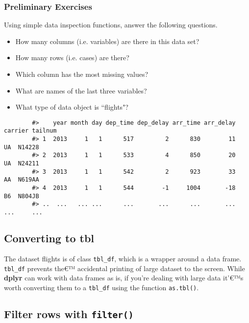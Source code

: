 	\subsubsection*{Preliminary Exercises}
	Using simple data inspection functions, answer the following questions. %
	\begin{itemize}
		\item How many columns (i.e. variables) are there in this data set?
		\item How many rows (i.e. cases) are there?
		\item Which column has the most missing values?
		\item What are names of the last three variables?
		\item What type of data object is ``flights"?
	\end{itemize}
	
	\begin{framed}
		\begin{verbatim}
		#>    year month day dep_time dep_delay arr_time arr_delay carrier tailnum
		#> 1  2013     1   1      517         2      830        11      UA  N14228
		#> 2  2013     1   1      533         4      850        20      UA  N24211
		#> 3  2013     1   1      542         2      923        33      AA  N619AA
		#> 4  2013     1   1      544        -1     1004       -18      B6  N804JB
		#> ..  ...   ... ...      ...       ...      ...       ...     ...     ...
		\end{verbatim}
	\end{framed}
	\subsection{Converting to tbl}
	The dataset flights is of class \texttt{tbl\_df}, which is a wrapper around a data frame. \texttt{tbl\_df} prevents the€™ accidental printing of large dataset to the screen. While \textbf{dplyr} can work with data frames as is, if you're dealing with large data it'€™s worth converting them to a \texttt{tbl\_df} using the function \texttt{as.tbl()}.
	
	
	
	\subsection{Filter rows with \texttt{filter()}}
	
